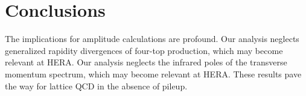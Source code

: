 \section{Conclusions}\label{sec:conclusions}

The implications for amplitude calculations are profound. Our analysis
neglects generalized rapidity divergences of four-top production, which
may become relevant at HERA. Our analysis neglects the infrared poles of
the transverse momentum spectrum, which may become relevant at HERA.
These results pave the way for lattice QCD in the absence of pileup.

